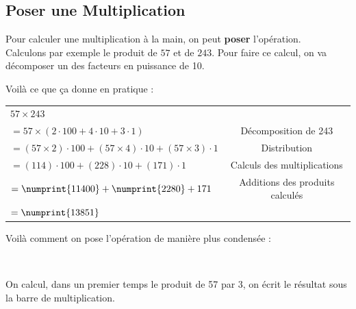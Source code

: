 \documentclass[a4paper, twoside]{article}
\begin{document}
\newpage

		\subsection{Poser une Multiplication}

			Pour calculer une multiplication à la main, on peut \textbf{poser} l'opération.\\

			Calculons par exemple le produit de $57$ et de $243$.
			Pour faire ce calcul, on va décomposer un des facteurs en puissance de 10.

			\vfill

			Voilà ce que ça donne en pratique :

			\doublespacing

			\begin{tabular}{l|c}

				$ 57 \times 243$

				\tabularnewline

				$= 57 \times (2\cdot100 + 4\cdot10 + 3\cdot1)$ & Décomposition de 243

				\tabularnewline

				$= (57 \times 2)\cdot100 + (57 \times 4)\cdot10 + (57 \times 3)\cdot1 $ & Distribution

				\tabularnewline

				$= (114)\cdot100 + (228)\cdot10 + (171)\cdot1 $ & Calculs des multiplications

				\tabularnewline

				$= \numprint{11400} + \numprint{2280} + 171 $ & Additions des produits calculés

				\tabularnewline

				$= \numprint{13851}$

			\end{tabular}

			\vfill

			\singlespacing

			Voilà comment on pose l'opération de manière plus condensée : 
				
				\begin{center}

				 \\
				
				\end{center}
				

			\vfill

			On calcul, dans un premier temps le produit de 57 par 3, 
			on écrit le résultat sous la barre de multiplication.\\
\end{document}
